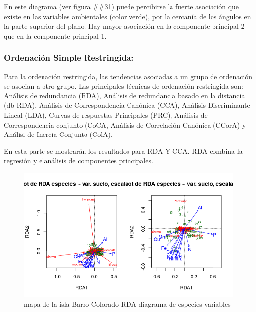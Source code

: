 \documentclass[11pt,]{article}
\begin{document}
En este diagrama (ver figura \#\#31) puede percibirse la fuerte
asociación que existe en las variables ambientales (color verde), por la
cercanía de los ángulos en la parte superior del plano. Hay mayor
asociación en la componente principal 2 que en la componente principal
1.

\subsubsection{Ordenación Simple
Restringida:}\label{ordenaciuxf3n-simple-restringida}

Para la ordenación restringida, las tendencias asociadas a un grupo de
ordenación se asocian a otro grupo. Las principales técnicas de
ordenación restringida son: Análisis de redundancia (RDA), Análisis de
redundancia basado en la distancia (db-RDA), Análisis de Correspondencia
Canónica (CCA), Análisis Discriminante Lineal (LDA), Curvas de
respuestas Principales (PRC), Análisis de Correspondencia conjunto
(CoCA, Análisis de Correlación Canónica (CCorA) y Análisi de Inercia
Conjunto (ColA).

En esta parte se mostrarán los resultados para RDA Y CCA. RDA combina la
regresión y elanálisis de componentes principales.

\begin{figure}
\centering
\includegraphics[width=1.00000\textwidth]{rda_escala_especies.png}
\caption{mapa de la isla Barro Colorado RDA diagrama de especies
variables\label{fig:bci_map}}
\end{figure}
\end{document}
